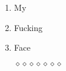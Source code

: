 \documentclass[11pt]{article}
\begin{document}
    \begin{enumerate}
        \item My
        \item Fucking
        \item Face
        \item[$\diamond$$\diamond$$\diamond$$\diamond$$\diamond$$\diamond$$\diamond$]
    \end{enumerate}
\end{document}

